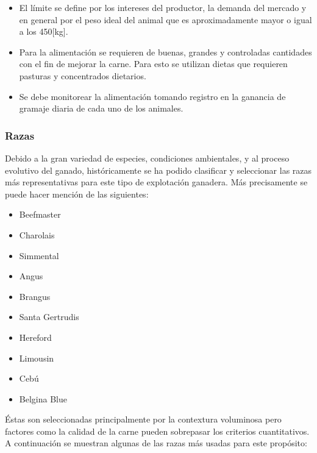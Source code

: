 \begin{itemize}
	\begin{itemize}
		\item El límite se define por los intereses del productor, la demanda del mercado y en general por el peso ideal del animal que es aproximadamente mayor o igual a los 450[kg].
		\item Para la alimentación se requieren de buenas, grandes y controladas cantidades con el fin de mejorar la carne. Para esto se utilizan dietas que requieren pasturas y concentrados dietarios.
		\item Se debe monitorear la alimentación tomando registro en la ganancia de gramaje diaria de cada uno de los animales.
	\end{itemize}
\end{itemize} 

\subsubsection{Razas} Debido a la gran variedad de especies, condiciones ambientales, y al proceso evolutivo del ganado, históricamente se ha podido clasificar y seleccionar las razas más representativas para este tipo de explotación ganadera. Más precisamente se puede hacer mención de las siguientes:
\begin{multicols}{2}
\begin{center}
\begin{itemize}
\item Beefmaster
\item Charolais
\item Simmental
\item Angus
\item Brangus
\item Santa Gertrudis
\item Hereford
\item Limousin
\item Cebú
\item Belgina Blue
\end{itemize}
\end{center}
\end{multicols}

Éstas son seleccionadas principalmente por la contextura voluminosa pero factores como la calidad de la carne pueden sobrepasar los criterios cuantitativos. A continuación se muestran algunas de las razas más usadas para este propósito:

